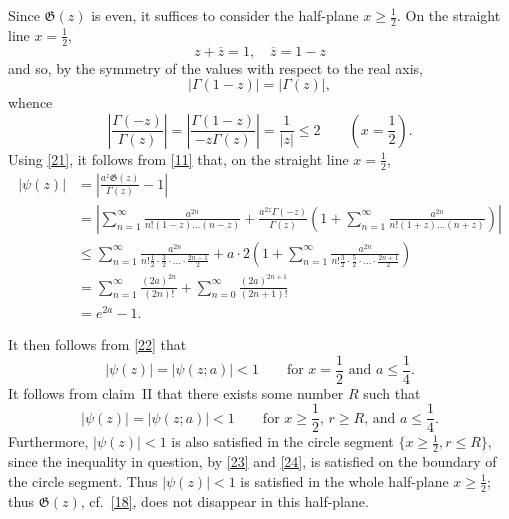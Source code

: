 \documentclass{article}
\theoremstyle{plain}
\newcommand{\GG}{\mathfrak{G}}
\renewcommand{\geq}{\geqslant}
\renewcommand{\leq}{\leqslant}
\newcommand{\oldpage}[1]{\marginpar{\footnotesize$\Big\vert$ \textit{p.~#1}}}
\begin{document}
\begin{enumerate}[I.]
    Since $\GG(z)$ is even, it suffices to consider the half-plane $x\geq\frac12$.
    On the straight line $x=\frac12$,
    \[
      z+\overline{z} = 1,
      \quad \overline{z} = 1-z
    \]
    and so, by the symmetry of the values with respect to the real axis,
    \[
      |\Gamma(1-z)| = |\Gamma(z)|,
    \]
    whence
    \[
    \label{21}
      \left\vert
        \frac{\Gamma(-z)}{\Gamma(z)}
      \right\vert = \left\vert
        \frac{\Gamma(1-z)}{-z\Gamma(z)}
      \right\vert = \frac{1}{|z|} \leq 2
      \qquad\left(
        x=\frac12
      \right).
    \tag{21}
    \]
    Using \cref{21}, it follows from \cref{11} that, on the straight line $x=\frac12$,
    \[
    \label{22}
      \begin{aligned}
        |\psi(z)|
        &= \left\vert
          \frac{a^z\GG(z)}{\Gamma(z)} - 1
        \right\vert
      \\&= \left\vert
          \sum_{n=1}^\infty \frac{a^{2n}}{n!(1-z)\ldots(n-z)}
          + \frac{a^{2z}\Gamma(-z)}{\Gamma(z)} \left(
            1 + \sum_{n=1}^\infty \frac{a^{2n}}{n!(1+z)\ldots(n+z)}
          \right)
        \right\vert
      \\&\leq \sum_{n=1}^\infty \frac{a^{2n}}{n!\frac12\cdot\frac32\cdot\ldots\cdot\frac{2n-1}{2}} + a\cdot2 \left(
        1 + \sum_{n=1}^\infty \frac{a^{2n}}{n!\frac32\cdot\frac52\cdot\ldots\cdot\frac{2n+1}{2}}
      \right)
      \\&= \sum_{n=1}^\infty \frac{(2a)^{2n}}{(2n)!} + \sum_{n=0}^\infty \frac{(2a)^{2n+1}}{(2n+1)!}
      \\&= e^{2a}-1.
      \end{aligned}
    \tag{22}
    \]

  \oldpage{311}
    It then follows from \cref{22} that
    \[
    \label{23}
      |\psi(z)| = |\psi(z;a)| < 1
      \qquad\mbox{for $x=\frac12$ and $a\leq\frac14$.}
    \tag{23}
    \]
    It follows from claim~II that there exists some number $R$ such that
    \[
    \label{24}
      |\psi(z)| = |\psi(z;a)| <1
      \qquad\mbox{for $x\geq\frac12$, $r\geq R$, and $a\leq\frac14$.}
    \tag{24}
    \]
    Furthermore, $|\psi(z)|<1$ is also satisfied in the circle segment $\{x\geq\frac12,r\leq R\}$, since the inequality in question, by \cref{23} and \cref{24}, is satisfied on the boundary of the circle segment.
    Thus $|\psi(z)|<1$ is satisfied in the whole half-plane $x\geq\frac12$;
    thus $\GG(z)$, cf.~\cref{18}, does not disappear in this half-plane.


\end{enumerate}
\end{document}
